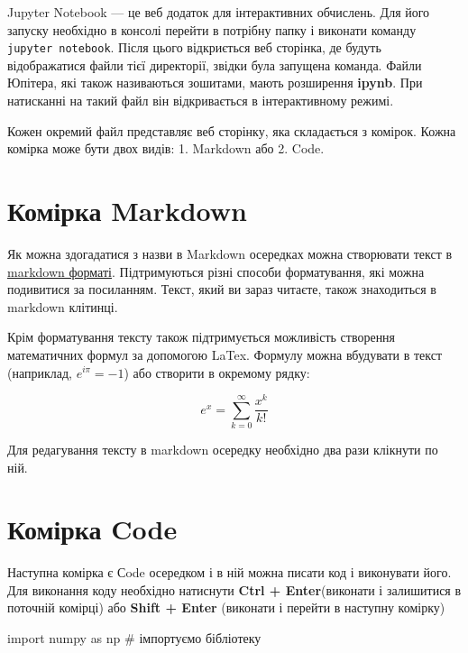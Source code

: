 \documentclass[
  letterpaper,
]{report}
\newenvironment{Shaded}{\begin{snugshade}}{\end{snugshade}}
\newcommand{\CommentTok}[1]{\textcolor[rgb]{0.37,0.37,0.37}{#1}}
\newcommand{\ImportTok}[1]{\textcolor[rgb]{0.00,0.46,0.62}{#1}}
\newcommand{\NormalTok}[1]{\textcolor[rgb]{0.00,0.23,0.31}{#1}}
\begin{document}
Jupyter Notebook --- це веб додаток для інтерактивних обчислень. Для
його запуску необхідно в консолі перейти в потрібну папку і виконати
команду \texttt{jupyter\ notebook}. Після цього відкриється веб
сторінка, де будуть відображатися файли тієї директорії, звідки була
запущена команда. Файли Юпітера, які також називаються зошитами, мають
розширення \textbf{ipynb}. При натисканні на такий файл він
відкривається в інтерактивному режимі.

Кожен окремий файл представляє веб сторінку, яка складається з комірок.
Кожна комірка може бути двох видів: 1. Markdown або 2. Code.

\hypertarget{ux43aux43eux43cux456ux440ux43aux430-markdown}{%
\section{Комірка
Markdown}\label{ux43aux43eux43cux456ux440ux43aux430-markdown}}

Як можна здогадатися з назви в Markdown осередках можна створювати текст
в
\href{http://jupyter-notebook.readthedocs.io/en/stable/examples/Notebook/Working\%20With\%20Markdown\%20Cells.html}{markdown
форматі}. Підтримуються різні способи форматування, які можна подивитися
за посиланням. Текст, який ви зараз читаєте, також знаходиться в
markdown клітинці.

Крім форматування тексту також підтримується можливість створення
математичних формул за допомогою LaTex. Формулу можна вбудувати в текст
(наприклад, \(e^{i\pi}=-1\)) або створити в окремому рядку:

\[e^x=\sum_{k=0}^\infty \frac{x^k}{k!}\]

Для редагування тексту в markdown осередку необхідно два рази клікнути
по ній.

\hypertarget{ux43aux43eux43cux456ux440ux43aux430-code}{%
\section{Комірка Code}\label{ux43aux43eux43cux456ux440ux43aux430-code}}

Наступна комірка є Сode осередком і в ній можна писати код і виконувати
його. Для виконання коду необхідно натиснути \textbf{Ctrl +
Enter}(виконати і залишитися в поточній комірці) або \textbf{Shift +
Enter} (виконати і перейти в наступну комірку)

\begin{Shaded}
\begin{Highlighting}[]
\ImportTok{import}\NormalTok{ numpy }\ImportTok{as}\NormalTok{ np }\CommentTok{\# імпортуємо бібліотеку}
\end{Highlighting}
\end{Shaded}
\end{document}

